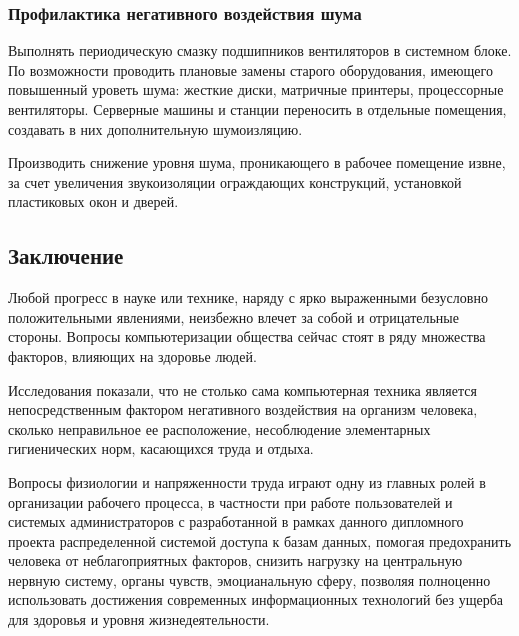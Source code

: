 \subsubsection{Профилактика негативного воздействия шума}
Выполнять периодическую смазку подшипников вентиляторов в системном блоке. По возможности проводить плановые замены старого оборудования, имеющего повышенный уроветь шума: жесткие диски, матричные принтеры, процессорные вентиляторы. Серверные машины и станции переносить в отдельные помещения, создавать в них дополнительную шумоизляцию.

Производить снижение уровня шума, проникающего в рабочее помещение извне, за счет увеличения звукоизоляции ограждающих конструкций, установкой пластиковых окон и дверей.

\subsection{Заключение}
Любой прогресс в науке или технике, наряду с ярко выраженными безусловно положительными явлениями, неизбежно влечет за собой и отрицательные стороны. Вопросы компьютеризации общества сейчас стоят в ряду множества факторов, влияющих на здоровье людей.

Исследования  показали, что не столько сама компьютерная техника является непосредственным фактором негативного воздействия на организм человека, сколько неправильное ее расположение, несоблюдение элементарных гигиенических норм, касающихся труда и отдыха.

Вопросы физиологии и напряженности труда играют одну из главных ролей   в организации рабочего процесса, в частности при работе пользователей и системых администраторов с разработанной в рамках данного дипломного проекта распределенной системой доступа к базам данных, помогая предохранить человека от неблагоприятных факторов, снизить нагрузку на центральную нервную систему, органы чувств, эмоцианальную сферу, позволяя полноценно использовать достижения современных информационных технологий без ущерба для здоровья и уровня жизнедеятельности.
